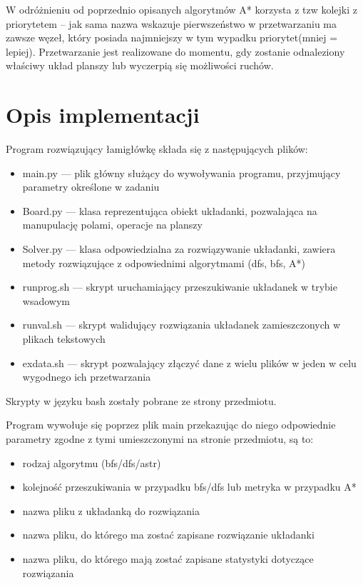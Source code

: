 \documentclass{classrep}
\begin{document}
W odróżnieniu od poprzednio opisanych algorytmów A* korzysta z tzw kolejki z priorytetem – jak sama nazwa wskazuje pierwszeństwo w przetwarzaniu ma zawsze węzeł, który posiada najmniejszy w tym wypadku priorytet(mniej = lepiej). Przetwarzanie jest realizowane do momentu, gdy zostanie odnaleziony właściwy układ planszy lub wyczerpią się możliwości ruchów.


\section{Opis implementacji}
Program rozwiązujący łamigłówkę składa się z następujących plików:
\begin{itemize}
      \item main.py --- plik główny służący do wywoływania programu, przyjmujący parametry określone w zadaniu
      \item Board.py --- klasa reprezentująca obiekt układanki, pozwalająca na manupulację polami, operacje na planszy
     \item Solver.py --- klasa odpowiedzialna za rozwiązywanie układanki, zawiera metody rozwiązujące z odpowiednimi algorytmami (dfs, bfs, A*)
     \item runprog.sh --- skrypt uruchamiający przeszukiwanie układanek w trybie wsadowym
     \item runval.sh --- skrypt walidujący rozwiązania układanek zamieszczonych w plikach tekstowych
     \item exdata.sh --- skrypt pozwalający złączyć dane z wielu plików w jeden w celu wygodnego ich przetwarzania
 \end{itemize}

Skrypty w języku bash zostały pobrane ze strony przedmiotu.

Program wywołuje się poprzez plik main przekazując do niego odpowiednie parametry zgodne z tymi umieszczonymi na stronie przedmiotu, są to:

\begin{itemize}
    \item rodzaj algorytmu (bfs/dfs/astr)
    \item kolejność przeszukiwania w przypadku bfs/dfs lub metryka w przypadku A*
    \item nazwa pliku z układanką do rozwiązania
    \item nazwa pliku, do którego ma zostać zapisane rozwiązanie układanki
    \item nazwa pliku, do którego mają zostać zapisane statystyki dotyczące rozwiązania
\end{itemize}
\end{document}
